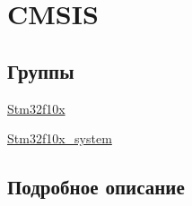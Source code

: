 \hypertarget{group___c_m_s_i_s}{}\section{C\+M\+S\+IS}
\label{group___c_m_s_i_s}
\subsection*{Группы}
\begin{DoxyCompactItemize}
\item 
\mbox{\hyperlink{group__stm32f10x}{Stm32f10x}}
\item 
\mbox{\hyperlink{group__stm32f10x__system}{Stm32f10x\+\_\+system}}
\end{DoxyCompactItemize}


\subsection{Подробное описание}
